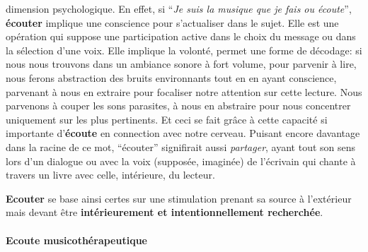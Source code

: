 dimension psychologique.
En effet, si \enquote{\emph{Je suis la musique que je fais ou écoute}}\autocite{viret:b}, \textbf{écouter} implique une conscience pour s'actualiser dans le sujet.
Elle est une opération
qui suppose une participation active dans le choix du message
ou dans la sélection d'une voix. Elle  implique la volonté,
permet une forme de décodage:
si nous nous trouvons dans un ambiance sonore à fort volume, pour
parvenir à lire, nous
ferons abstraction des bruits environnants tout en en ayant
conscience, parvenant à nous en extraire pour focaliser notre
attention sur cette lecture. Nous parvenons à couper les sons parasites, à nous en abstraire pour
nous concentrer uniquement sur les plus  pertinents. Et ceci se fait grâce à cette capacité si importante
d'\textbf{écoute} en connection avec notre cerveau.
Puisant encore davantage dans  la racine de ce mot, ``écouter'' signifirait
aussi \emph{partager}, ayant tout son sens lors d'un dialogue ou
avec la voix (supposée, imaginée) de  l'écrivain qui
 chante à travers un livre avec celle, intérieure, du lecteur.


  \textbf{Ecouter} se base ainsi certes sur une stimulation prenant sa source à
l'extérieur mais devant être \textbf{ intérieurement et intentionnellement
	recherchée}.




      \paragraph{Ecoute musicothérapeutique}


